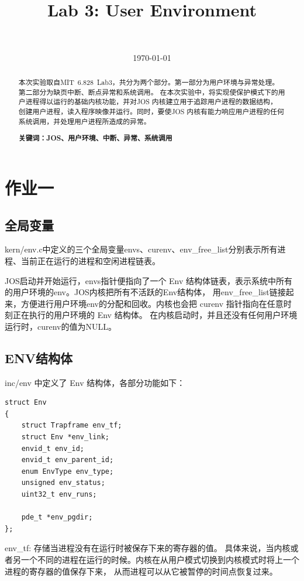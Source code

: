 \documentclass[12pt,a4paper,UTF8]{article}
\begin{document}
\title{Lab 3:  User Environment}
\author{\ }
\date{\today}

\maketitle

\begin{abstract}
    \setlength{\parindent}{2em}
    本次实验取自MIT\ 6.828\ Lab3，共分为两个部分。第一部分为用户环境与异常处理。第二部分为缺页中断、断点异常和系统调用。
    在本次实验中，将实现使保护模式下的用户进程得以运行的基础内核功能，并对JOS 内核建立用于追踪用户进程的数据结构，
    创建用户进程，读入程序映像并运行。同时，要使JOS 内核有能力响应用户进程的任何系统调用，并处理用户进程所造成的异常。

    \textbf{关键词：JOS、用户环境、中断、异常、系统调用}
\end{abstract}

\section{作业一}
    \subsection{全局变量}
    kern/env.c中定义的三个全局变量envs、curenv、env\_free\_list分别表示所有进程、当前正在运行的进程和空闲进程链表。

    JOS启动并开始运行，envs指针便指向了一个 Env 结构体链表，表示系统中所有的用户环境的env。JOS内核把所有不活跃的Env结构体，
    用env\_free\_list链接起来，方便进行用户环境env的分配和回收。内核也会把 curenv 指针指向在任意时刻正在执行的用户环境的 Env 结构体。
    在内核启动时，并且还没有任何用户环境运行时，curenv的值为NULL。


    \subsection{ENV结构体}
    inc/env 中定义了 Env 结构体，各部分功能如下：

    \begin{lstlisting}[style=CPP]
struct Env
{
    struct Trapframe env_tf;
    struct Env *env_link;
    envid_t env_id;
    envid_t env_parent_id;
    enum EnvType env_type;
    unsigned env_status;
    uint32_t env_runs;

    pde_t *env_pgdir;
};
    \end{lstlisting}

    env\_tf:
    存储当进程没有在运行时被保存下来的寄存器的值。
    具体来说，当内核或者另一个不同的进程在运行的时候。内核在从用户模式切换到内核模式时将上一个进程的寄存器的值保存下来，
    从而进程可以从它被暂停的时间点恢复过来。
    
\end{document}
